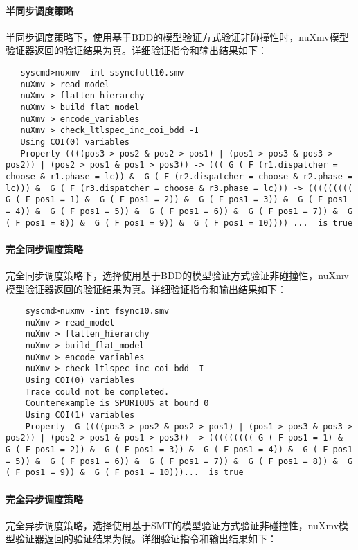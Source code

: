 \paragraph{半同步调度策略}
半同步调度策略下，使用基于BDD的模型验证方式验证非碰撞性时，nuXmv模型验证器返回的验证结果为真。详细验证指令和输出结果如下：


\begin{lstlisting}
   syscmd>nuxmv -int ssyncfull10.smv
   nuXmv > read_model
   nuXmv > flatten_hierarchy
   nuXmv > build_flat_model
   nuXmv > encode_variables
   nuXmv > check_ltlspec_inc_coi_bdd -I
   Using COI(0) variables
   Property ((((pos3 > pos2 & pos2 > pos1) | (pos1 > pos3 & pos3 > pos2)) | (pos2 > pos1 & pos1 > pos3)) -> ((( G ( F (r1.dispatcher = choose & r1.phase = lc)) &  G ( F (r2.dispatcher = choose & r2.phase = lc))) &  G ( F (r3.dispatcher = choose & r3.phase = lc))) -> ((((((((( G ( F pos1 = 1) &  G ( F pos1 = 2)) &  G ( F pos1 = 3)) &  G ( F pos1 = 4)) &  G ( F pos1 = 5)) &  G ( F pos1 = 6)) &  G ( F pos1 = 7)) &  G ( F pos1 = 8)) &  G ( F pos1 = 9)) &  G ( F pos1 = 10)))) ...  is true
\end{lstlisting}


\paragraph{完全同步调度策略}
完全同步调度策略下，选择使用基于BDD的模型验证方式验证非碰撞性，nuXmv模型验证器返回的验证结果为真。详细验证指令和输出结果如下：

\begin{lstlisting}
    syscmd>nuxmv -int fsync10.smv
    nuXmv > read_model
    nuXmv > flatten_hierarchy
    nuXmv > build_flat_model
    nuXmv > encode_variables
    nuXmv > check_ltlspec_inc_coi_bdd -I
    Using COI(0) variables
    Trace could not be completed.
    Counterexample is SPURIOUS at bound 0
    Using COI(1) variables
    Property  G ((((pos3 > pos2 & pos2 > pos1) | (pos1 > pos3 & pos3 > pos2)) | (pos2 > pos1 & pos1 > pos3)) -> ((((((((( G ( F pos1 = 1) &  G ( F pos1 = 2)) &  G ( F pos1 = 3)) &  G ( F pos1 = 4)) &  G ( F pos1 = 5)) &  G ( F pos1 = 6)) &  G ( F pos1 = 7)) &  G ( F pos1 = 8)) &  G ( F pos1 = 9)) &  G ( F pos1 = 10)))...  is true
\end{lstlisting}

\paragraph{完全异步调度策略}
完全异步调度策略，选择使用基于SMT的模型验证方式验证非碰撞性，nuXmv模型验证器返回的验证结果为假。详细验证指令和输出结果如下：

